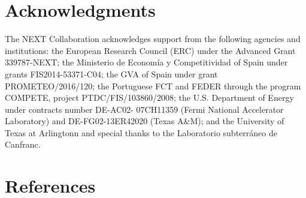 \documentclass[a4paper, 10pt, oneside, twocolumn, 3p]{elsarticle}
\begin{document}
\section{Acknowledgments}

The NEXT Collaboration acknowledges support from the following agencies and institutions: the European Research Council (ERC) under the Advanced Grant 339787-NEXT; the Ministerio de Econom\'ia y Competitividad of Spain under grants FIS2014-53371-C04; the GVA of Spain under grant PROMETEO/2016/120; the Portuguese FCT and FEDER through the program COMPETE, project PTDC/FIS/103860/2008; the U.S. Department of Energy under contracts number DE-AC02- 07CH11359 (Fermi National Accelerator Laboratory) and DE-FG02-13ER42020 (Texas A\&M); and the University of Texas at Arlingtonn and special thanks to the Laboratorio subterr\'aneo de Canfranc.


\section*{References}


\end{document}
